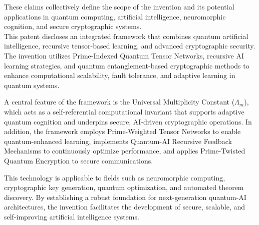 \pa These claims collectively define the scope of the invention and its potential applications in quantum computing, artificial intelligence, neuromorphic cognition, and secure cryptographic systems.
\\
\pa This patent discloses an integrated framework that combines quantum artificial intelligence, recursive tensor-based learning, and advanced cryptographic security. The invention utilizes Prime-Indexed Quantum Tensor Networks, recursive AI learning strategies, and quantum entanglement-based cryptographic methods to enhance computational scalability, fault tolerance, and adaptive learning in quantum systems.

\pa A central feature of the framework is the Universal Multiplicity Constant ($\Lambda_m$), which acts as a self-referential computational invariant that supports adaptive quantum cognition and underpins secure, AI-driven cryptographic operations. In addition, the framework employs Prime-Weighted Tensor Networks to enable quantum-enhanced learning, implements Quantum-AI Recursive Feedback Mechanisms to continuously optimize performance, and applies Prime-Twisted Quantum Encryption to secure communications.

\pa This technology is applicable to fields such as neuromorphic computing, cryptographic key generation, quantum optimization, and automated theorem discovery. By establishing a robust foundation for next-generation quantum-AI architectures, the invention facilitates the development of secure, scalable, and self-improving artificial intelligence systems.




